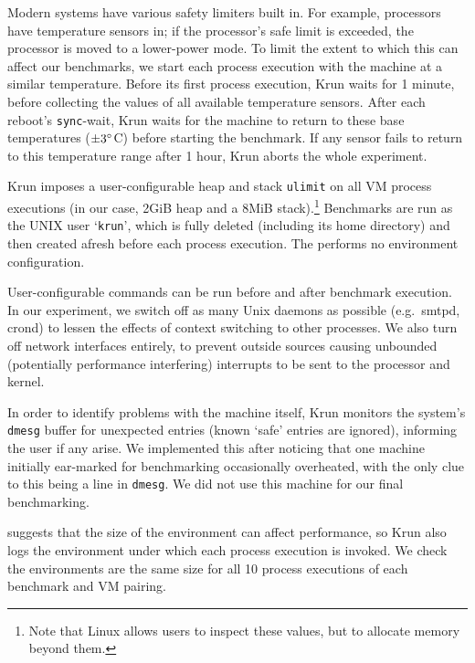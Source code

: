 \documentclass[preprint,numbers,10pt]{sigplanconf}
\newcommand{\krun}{Krun\xspace}
\begin{document}
Modern systems have various safety limiters built in. For example,
processors have temperature sensors in; if the processor's safe limit
is exceeded, the processor is moved to a lower-power mode. To limit the extent to which this can
affect our benchmarks, we start each process execution with the machine at a similar temperature.
Before its first process execution, \krun waits for 1 minute, before collecting
the values of all available temperature sensors. After each reboot's \texttt{sync}-wait, \krun waits
for the machine to return to these base temperatures ($\pm3\degree$C) before
starting the benchmark. If any sensor fails to return to this temperature range
after 1 hour, \krun aborts the whole experiment.

\krun imposes a
user-configurable heap and stack \texttt{ulimit} on all VM process executions
(in our case, 2GiB heap and a 8MiB stack).\footnote{Note that Linux allows users
to inspect these values, but to allocate memory beyond them.} Benchmarks are run
as the UNIX user `\texttt{krun}', which is fully deleted (including its home
directory) and then created afresh before each process execution.
 The
performs no environment configuration.

User-configurable commands can be run before and after benchmark execution. In
our experiment, we switch off as many Unix daemons as possible (e.g.~smtpd,
crond) to lessen the effects of context switching to other processes. We also
turn off network interfaces entirely, to prevent outside sources causing unbounded
(potentially performance interfering) interrupts to be sent to the processor and kernel.

In order to identify problems with the machine itself, \krun monitors the
system's \texttt{dmesg} buffer for unexpected entries (known `safe' entries
are ignored), informing the user if any arise. We implemented this after
noticing that one machine initially ear-marked for benchmarking occasionally
overheated, with the only clue to this being a line in \texttt{dmesg}.
We did not use this machine for our final benchmarking.

  suggests that the size of the environment can affect
performance, so \krun also logs the environment under which each process
execution is invoked. We check the environments are the same size for all 10
process executions of each benchmark and VM pairing.
\end{document}
